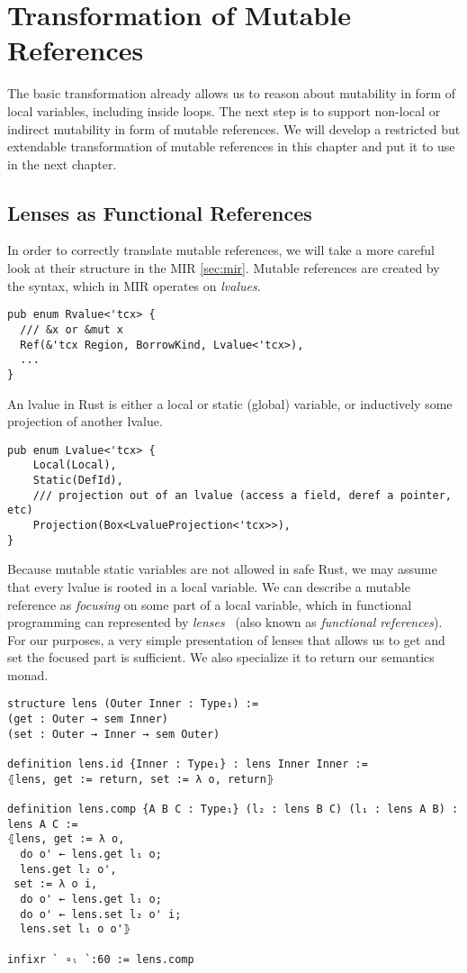 \section{Transformation of Mutable References}
\label{sec:mutref}

The basic transformation already allows us to reason about mutability in
form of local variables, including inside loops. The next step is to support
non-local or indirect mutability in form of mutable references. We will develop
a restricted but extendable transformation of mutable references in this chapter
and put it to use in the next chapter.

\subsection{Lenses as Functional References}

In order to correctly translate mutable references, we will take a more careful
look at their structure in the MIR \autoref{sec:mir}. Mutable references are
created by the  syntax, which in MIR operates on \emph{lvalues}.

\begin{verbatim}
pub enum Rvalue<'tcx> {
  /// &x or &mut x
  Ref(&'tcx Region, BorrowKind, Lvalue<'tcx>),
  ...
}
\end{verbatim}

An lvalue in Rust is either a local or static (global) variable, or inductively some
projection of another lvalue.

\begin{verbatim}
pub enum Lvalue<'tcx> {
    Local(Local),
    Static(DefId),
    /// projection out of an lvalue (access a field, deref a pointer, etc)
    Projection(Box<LvalueProjection<'tcx>>),
}
\end{verbatim}

Because mutable static variables are not allowed in safe Rust, we may assume
that every lvalue is rooted in a local variable. We can describe a mutable
reference as \emph{focusing} on some part of a local variable, which in
functional programming can represented by
\emph{lenses}~\cite{foster2005combinators} (also known as \emph{functional
  references}). For our purposes, a very simple presentation of lenses that
allows us to get and set the focused part is sufficient. We also specialize it
to return our semantics monad.

\begin{verbatim}
structure lens (Outer Inner : Type₁) :=
(get : Outer → sem Inner)
(set : Outer → Inner → sem Outer)

definition lens.id {Inner : Type₁} : lens Inner Inner :=
⦃lens, get := return, set := λ o, return⦄

definition lens.comp {A B C : Type₁} (l₂ : lens B C) (l₁ : lens A B) : lens A C :=
⦃lens, get := λ o,
  do o' ← lens.get l₁ o;
  lens.get l₂ o',
 set := λ o i,
  do o' ← lens.get l₁ o;
  do o' ← lens.set l₂ o' i;
  lens.set l₁ o o'⦄

infixr ` ∘ₗ `:60 := lens.comp
\end{verbatim}

